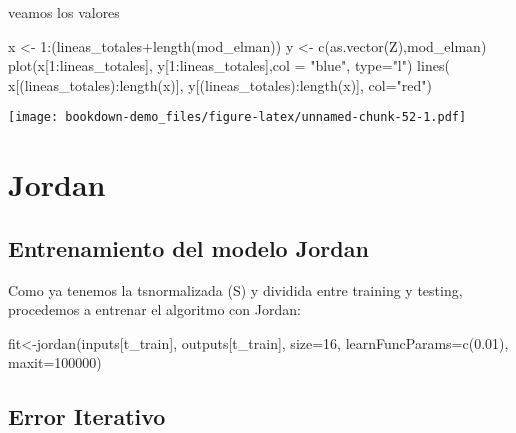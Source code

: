 \documentclass[
]{book}
\newenvironment{Shaded}{\begin{snugshade}}{\end{snugshade}}
\newcommand{\AttributeTok}[1]{\textcolor[rgb]{0.77,0.63,0.00}{#1}}
\newcommand{\DecValTok}[1]{\textcolor[rgb]{0.00,0.00,0.81}{#1}}
\newcommand{\FloatTok}[1]{\textcolor[rgb]{0.00,0.00,0.81}{#1}}
\newcommand{\FunctionTok}[1]{\textcolor[rgb]{0.00,0.00,0.00}{#1}}
\newcommand{\NormalTok}[1]{#1}
\newcommand{\OtherTok}[1]{\textcolor[rgb]{0.56,0.35,0.01}{#1}}
\newcommand{\SpecialCharTok}[1]{\textcolor[rgb]{0.00,0.00,0.00}{#1}}
\newcommand{\StringTok}[1]{\textcolor[rgb]{0.31,0.60,0.02}{#1}}
\begin{document}
veamos los valores

\begin{Shaded}
\begin{Highlighting}[]
\NormalTok{x }\OtherTok{\textless{}{-}} \DecValTok{1}\SpecialCharTok{:}\NormalTok{(lineas\_totales}\SpecialCharTok{+}\FunctionTok{length}\NormalTok{(mod\_elman))}
\NormalTok{y }\OtherTok{\textless{}{-}} \FunctionTok{c}\NormalTok{(}\FunctionTok{as.vector}\NormalTok{(Z),mod\_elman)}
\FunctionTok{plot}\NormalTok{(x[}\DecValTok{1}\SpecialCharTok{:}\NormalTok{lineas\_totales], y[}\DecValTok{1}\SpecialCharTok{:}\NormalTok{lineas\_totales],}\AttributeTok{col =} \StringTok{"blue"}\NormalTok{, }\AttributeTok{type=}\StringTok{"l"}\NormalTok{)}
\FunctionTok{lines}\NormalTok{( x[(lineas\_totales)}\SpecialCharTok{:}\FunctionTok{length}\NormalTok{(x)], y[(lineas\_totales)}\SpecialCharTok{:}\FunctionTok{length}\NormalTok{(x)], }\AttributeTok{col=}\StringTok{"red"}\NormalTok{)}
\end{Highlighting}
\end{Shaded}

\texttt{[image: bookdown-demo\_files/figure-latex/unnamed-chunk-52-1.pdf]}

\hypertarget{jordan}{%
\section{Jordan}\label{jordan}}

\hypertarget{entrenamiento-del-modelo-jordan}{%
\subsection{Entrenamiento del modelo Jordan}\label{entrenamiento-del-modelo-jordan}}

Como ya tenemos la tsnormalizada (S) y dividida entre training y testing, procedemos a entrenar el algoritmo con Jordan:

\begin{Shaded}
\begin{Highlighting}[]
\NormalTok{fit}\OtherTok{\textless{}{-}}\FunctionTok{jordan}\NormalTok{(inputs[t\_train],}
\NormalTok{    outputs[t\_train],}
    \AttributeTok{size=}\DecValTok{16}\NormalTok{,}
    \AttributeTok{learnFuncParams=}\FunctionTok{c}\NormalTok{(}\FloatTok{0.01}\NormalTok{),}
    \AttributeTok{maxit=}\DecValTok{100000}\NormalTok{)}
\end{Highlighting}
\end{Shaded}

\hypertarget{error-iterativo}{%
\subsection{Error Iterativo}\label{error-iterativo}}
\end{document}
